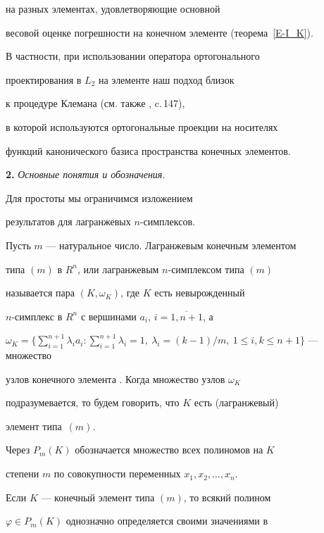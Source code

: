 на разных элементах, удовлетворяющие основной 


весовой оценке погрешности на конечном элементе (теорема~\ref{E-I_K}). 


В частности, при использовании оператора ортогонального 


проектирования в $L_2$ на элементе наш подход близок 


к процедуре Клемана \cite{Cleman} (см. также \cite{Ciarlet}, c.\,147), 


в которой используются ортогональные проекции на носителях 


функций канонического базиса пространства конечных элементов. 


\medskip





{\bf 2.} {\it  Основные понятия и обозначения.} 


Для простоты мы ограничимся изложением 


результатов для лагранжевых $n$-симплексов. 


Пусть $m$ --- натуральное число. Лагранжевым конечным элементом 


типа $(m)$ в $R^n$, или лагранжевым $n$-симплексом типа $(m)$ 


называется пара $(K,\omega_K)$, где $K$ есть невырожденный 


$n$-симплекс в $R^n$ с вершинами $a_i$, $i=\overline{1,n+1}$, а 


$\omega_K= \Big\{{\sum \limits_{i=1}^{n+1}\lambda_i a_i :


\sum \limits_{i=1}^{n+1} \lambda_i=1, 


\ \lambda_i=(k-1)/m, \ 1 \le i,k \le n+1} \Big\}$ --- множество 


узлов конечного элемента \cite{Ciarlet}. Когда множество узлов $\omega_K$ 


подразумевается, то будем говорить, что $K$ есть (лагранжевый) 


элемент типа~$(m)$.





Через $P_m(K)$ обозначается множество всех полиномов на $K$ 


степени $m$ по совокупности переменных $x_1,x_2, \dotsc ,x_n$. 


Если $K$ --- конечный элемент типа $(m)$, то всякий полином 


$\varphi \in P_m(K)$ однозначно определяется своими значениями в 



